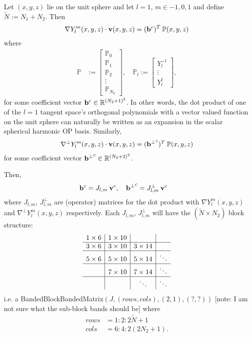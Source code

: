 \documentclass[11pt, oneside]{article}   	%
\newcommand{\R}{\mathbb{R}}
\newcommand{\bigP}{\mathbb{P}}
\newcommand{\Pl}{\mathbb{P}_l}
\newcommand{\gradYlm}{\nabla Y^m_l}
\newcommand{\gradpYlm}{\nabla^\perp Y^m_l}
\begin{document}
Let \((x,y,z)\) lie on the unit sphere and let \(l = 1\), \(m \in {-1, 0, 1}\) and define \(\tilde{N} := N_1 + N_2\). Then
\begin{align}
\gradYlm(x,y,z) \cdot \bold{v}(x,y,z) = (\bold{b}^c)^T  \: \bigP(x,y,z)
\end{align}
where
\begin{align}
\bigP &:= \begin{bmatrix}
		\bigP_0 \\
		\bigP_1 \\
		\bigP_2 \\
		\vdots \\
		\bigP_{N_2}
	  \end{bmatrix}, \quad 
\Pl := \begin{bmatrix}
		Y_l^{-l} \\
		\vdots \\	
		Y_l^l
	  \end{bmatrix},
\end{align}
for some coefficient vector \(\bold{b}^c \in \R^{(N_2+1)^2}\). In other words, the dot product of one of the \(l=1\) tangent space's orthogonal polynomials with a vector valued function on the unit sphere can naturally be written as an expansion in the scalar spherical harmonic OP basis. Similarly,
\begin{align}
\gradpYlm(x,y,z) \cdot \bold{v}(x,y,z) = (\bold{b^\perp}^c)^T  \: \bigP(x,y,z)
\end{align}
for some coefficient vector \(\bold{b^\perp}^c \in \R^{(N_2+2)^2}\).

Then, 
\begin{align}
\bold{b}^c &= J_{l,m} \: \bold{v}^c, \quad 
\bold{b^\perp}^c = J^\perp_{l,m} \: \bold{v}^c
\end{align}
where \(J_{l,m}\), \(J^\perp_{l,m}\) are (operator) matrices for the dot product with \(\gradYlm(x,y,z)\) and \(\gradpYlm(x,y,z)\) respectively.
Each \(J_{l,m}\), \(J^\perp_{l,m}\) will have the \((\tilde{N} \times N_2)\) block structure:
\begin{align}
	\begin{array}{c|c|c|c}
		1 \times 6 & 1 \times 10 & \\
		\hline
		3 \times 6 & 3 \times 10 & 3 \times 14 & \\
		\hline
		5 \times 6 & 5 \times 10 & 5 \times 14 & \ddots \\
		\hline
		&  7 \times 10 & 7 \times 14 & \ddots \\
		\hline
		& & \ddots & \ddots \\
	  \end{array}
\end{align}
i.e. a BandedBlockBandedMatrix\((J, (rows, cols), (2,1), (?,?))\) [note: I am not sure what the sub-block bands should be] where 
\begin{align}
rows &= 1:2:2\tilde{N}+1 \\
cols &= 6:4:2(2N_2+1).
\end{align}
\end{document}
